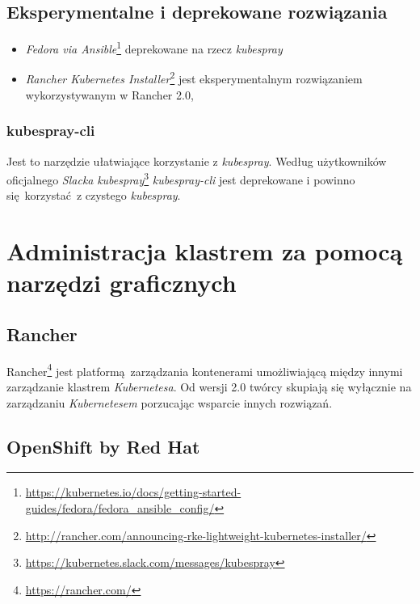 \documentclass[a4paper,12pt,twoside,openany]{report}
\providecommand{\tightlist}{%
  \setlength{\itemsep}{0pt}\setlength{\parskip}{0pt}}
\DeclareRobustCommand{\href}[2]{#2\footnote{\url{#1}}}
\begin{document}
\hypertarget{eksperymentalne-i-deprekowane-rozwiux105zania}{%
\subsection{Eksperymentalne i deprekowane
rozwiązania}\label{eksperymentalne-i-deprekowane-rozwiux105zania}}

\begin{itemize}
\tightlist
\item
  \href{https://kubernetes.io/docs/getting-started-guides/fedora/fedora_ansible_config/}{\emph{Fedora
  via Ansible}} deprekowane na rzecz \emph{kubespray}
\item
  \href{http://rancher.com/announcing-rke-lightweight-kubernetes-installer/}{\emph{Rancher
  Kubernetes Installer}} jest eksperymentalnym rozwiązaniem
  wykorzystywanym w Rancher 2.0,
\end{itemize}

\hypertarget{kubespray-cli}{%
\subsubsection{kubespray-cli}\label{kubespray-cli}}

Jest to narzędzie ułatwiające korzystanie z \emph{kubespray}. Według
użytkowników
\href{https://kubernetes.slack.com/messages/kubespray}{oficjalnego
\emph{Slacka} \emph{kubespray}} \emph{kubespray-cli} jest deprekowane i
powinno się~korzystać~z czystego \emph{kubespray}.

\hypertarget{administracja-klastrem-za-pomocux105-narzux119dzi-graficznych}{%
\section{Administracja klastrem za pomocą narzędzi
graficznych}\label{administracja-klastrem-za-pomocux105-narzux119dzi-graficznych}}

\hypertarget{rancher}{%
\subsection{Rancher}\label{rancher}}

\href{https://rancher.com/}{Rancher} jest platformą~zarządzania
kontenerami umożliwiającą między innymi zarządzanie klastrem
\emph{Kubernetesa}. Od wersji 2.0 twórcy skupiają się wyłącznie na
zarządzaniu \emph{Kubernetesem} porzucając wsparcie innych rozwiązań.

\hypertarget{openshift-origin}{%
\subsection{OpenShift by Red Hat}\label{openshift-origin}}
\end{document}
